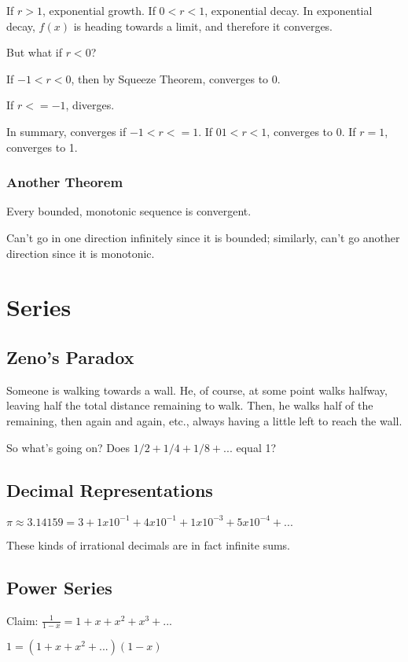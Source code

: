 \documentclass{article}
\begin{document}
If $r>1$, exponential growth. If $0<r<1$, exponential decay. In exponential decay, $f(x)$ is heading towards a limit, and therefore it converges. 

But what if $r<0$?

If $-1<r<0$, then by Squeeze Theorem, converges to 0.

If $r<=-1$, diverges.

In summary, converges if $-1<r<=1$. If $01<r<1$, converges to 0. If $r=1$, converges to 1.

\subsubsection{Another Theorem}

Every bounded, monotonic sequence is convergent.

Can't go in one direction infinitely since it is bounded; similarly, can't go another direction since it is monotonic.

\section{Series}
\subsection{Zeno's Paradox}

Someone is walking towards a wall. He, of course, at some point walks halfway, leaving half the total distance remaining to walk. Then, he walks half of the remaining, then again and again, etc., always having a little left to reach the wall.

So what's going on? Does $1/2+1/4+1/8+...$ equal 1?

\subsection{Decimal Representations}

$\pi \approx 3.14159 = 3 + 1x10^{-1}+4x10^{-1}+1x10^{-3}+5x10^{-4}+...$

These kinds of irrational decimals are in fact infinite sums. 

\subsection{Power Series}

Claim:
$\frac{1}{1-x} = 1+x+x^2+x^3+...$

$1=(1+x+x^2+...)(1-x)$
\end{document}

